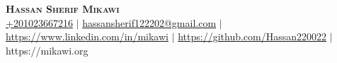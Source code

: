 \documentclass[letterpaper,10pt]{article}
\makeatletter
\newcommand{\resumeEducationHeading}[6]{
  \vspace{-2pt}\item
    \begin{tabular*}{0.97\textwidth}[t]{l@{\extracolsep{\fill}}r}
      \textbf{#1} & #2 \\
      \textit{\small#3} & \textit{\small #4} \\
      \textit{\small#5} & \textit{\small #6} \\
    \end{tabular*}\vspace{-5pt}
}
\makeatother
\begin{document}

\begin{center}
    \textbf{\Huge \scshape Hassan Sherif Mikawi} \\ \vspace{5pt}
    \small
    \hspace{.5pt} \href{tel:+201023667216}{+201023667216}
    $|$
    \hspace{.5pt} \href{mailto:hassansherif122202@gmail.com}{hassansherif122202@gmail.com}
    $|$
    \hspace{.5pt} \href{https://www.linkedin.com/in/mikawi}{https://www.linkedin.com/in/mikawi}
    $|$
    \hspace{.5pt} \href{https://github.com/Hassan220022}{https://github.com/Hassan220022}
    $|$
    https://mikawi.org
\end{center}



  
\end{document}
